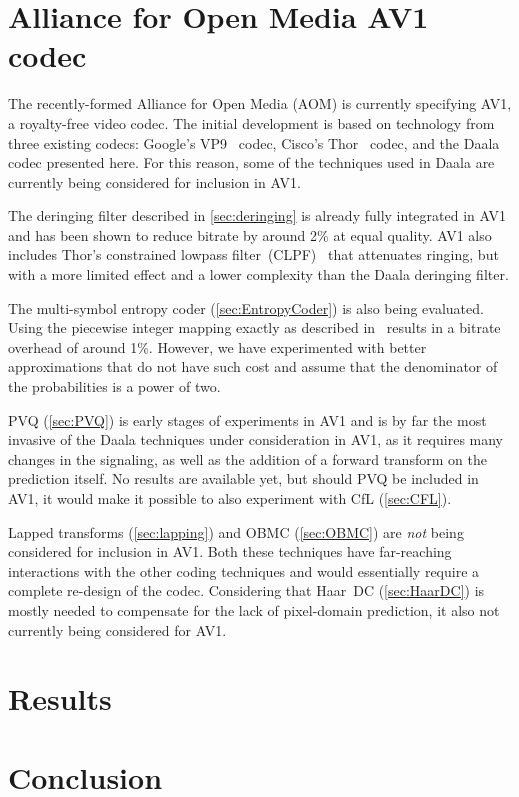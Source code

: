 \documentclass[english,conference,10pt]{IEEEtran}
\begin{document}
\section{Alliance for Open Media AV1 codec}
\label{sec:AOM}

The recently-formed Alliance for Open Media (AOM) is currently specifying
AV1, a royalty-free video codec. The initial development is based on
technology from three existing codecs: Google's VP9~\cite{VP9Spec} codec,
Cisco's Thor~\cite{ThorDraft} codec, and the Daala codec presented
here. For this reason, some of the techniques used in Daala are currently
being considered for inclusion in AV1.

The deringing filter described in \cref{sec:deringing} is already
fully integrated in AV1 and has been shown to reduce bitrate by around 2\%
at equal quality. AV1 also includes Thor's constrained lowpass
filter~(CLPF)~\cite{CLPFDraft} that attenuates ringing, but with a more
limited effect and a lower complexity than the Daala deringing filter.

The multi-symbol entropy coder (\cref{sec:EntropyCoder}) is also being
evaluated. Using the piecewise
integer mapping exactly as described in~\cite{stuiver1998piecewise} results
in a bitrate overhead of around 1\%. However, we have experimented with
better approximations that do not have such cost and assume that
the denominator of the probabilities is a power of two.

PVQ (\cref{sec:PVQ}) is early stages of experiments in AV1 and is by far
the most invasive
of the Daala techniques under consideration in AV1, as it requires many changes
in the signaling, as well as the addition of a forward transform on the
prediction itself. No results are available yet, but should PVQ be
included in AV1, it would make it possible to also experiment with CfL
(\cref{sec:CFL}).

Lapped transforms (\cref{sec:lapping}) and OBMC (\cref{sec:OBMC}) are 
\textit{not} being considered for inclusion
in AV1. Both these techniques have far-reaching interactions with the
other coding techniques and would essentially require a complete re-design
of the codec. Considering that Haar~DC (\cref{sec:HaarDC}) is mostly
needed to compensate for the
lack of pixel-domain prediction, it also not currently being considered for AV1.

\section{Results}
\label{sec:Results}


\section{Conclusion}



\end{document}
